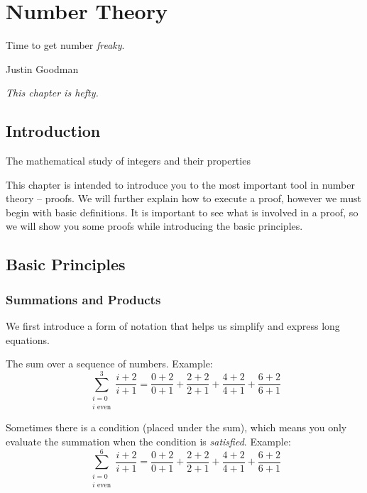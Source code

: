 \documentclass[main.tex]{subfiles}
\begin{document}
\chapter{Number Theory}

\epigraph{Time to get number \textit{freaky}.}{Justin Goodman}

\begin{center}
	\textit{This chapter is hefty.}
\end{center}

\minitoc

\section{Introduction}

\begin{defn}
	The mathematical study of integers and their properties
\end{defn}

This chapter is intended to introduce you to the most important tool in number theory -- proofs. We will further explain how to execute a proof, however we must begin with basic definitions. It is important to see what is involved in a proof, so we will show you some proofs while introducing the basic principles.

\section{Basic Principles}

\subsection{Summations and Products}

We first introduce a form of notation that helps us simplify and express long equations.

\begin{defn}
	The sum over a sequence of numbers. Example: \[\sum_{\substack{i = 0 \\ i \text{ even}}}^{3} \frac{i+2}{i+1} = \frac{0+2}{0+1}+\frac{2+2}{2+1}+\frac{4+2}{4+1}+\frac{6+2}{6+1}\]
	
	Sometimes there is a condition (placed under the sum), which means you only evaluate the summation when the condition is \textit{satisfied}. Example: \[\sum_{\substack{i = 0 \\ i \text{ even}}}^{6} \frac{i+2}{i+1} = \frac{0+2}{0+1}+\frac{2+2}{2+1}+\frac{4+2}{4+1}+\frac{6+2}{6+1}\]
\end{defn}
\end{document}
